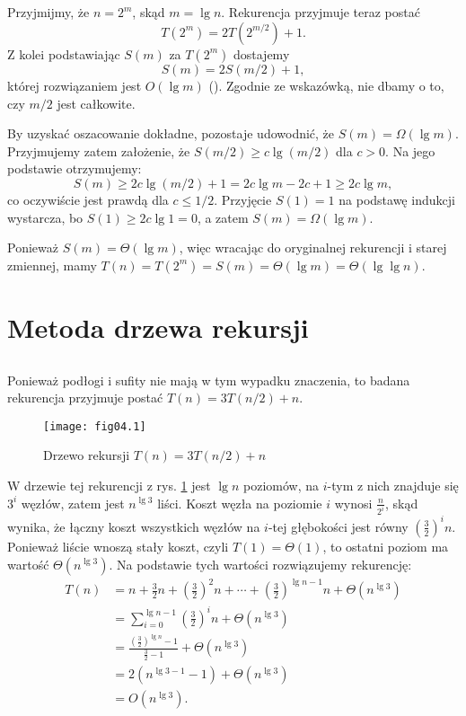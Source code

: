 \subsection{} %
Przyjmijmy, że $n=2^m$, skąd $m=\lg n$. Rekurencja przyjmuje teraz postać
\[
	T(2^m) = 2T(2^{m/2})+1.
\]
Z kolei podstawiając $S(m)$ za $T(2^m)$ dostajemy
\[
	S(m) = 2S(m/2)+1,
\]
której rozwiązaniem jest $O(\lg m)$ (). Zgodnie ze wskazówką, nie dbamy o to, czy $m/2$ jest całkowite.

By uzyskać oszacowanie dokładne, pozostaje udowodnić, że $S(m)=\Omega(\lg m)$. Przyjmujemy zatem założenie, że $S(m/2)\ge c\lg(m/2)$ dla $c>0$. Na jego podstawie otrzymujemy:
\[
	S(m) \ge 2c\lg(m/2)+1 = 2c\lg m-2c+1 \ge 2c\lg m,
\]
co oczywiście jest prawdą dla $c\le1/2$. Przyjęcie $S(1)=1$ na podstawę indukcji wystarcza, bo $S(1)\ge2c\lg1=0$, a zatem $S(m)=\Omega(\lg m)$.

Ponieważ $S(m)=\Theta(\lg m)$, więc wracając do oryginalnej rekurencji i starej zmiennej, mamy $T(n)=T(2^m)=S(m)=\Theta(\lg m)=\Theta(\lg\lg n)$.

\section{Metoda drzewa rekursji}

\subsection{} %
Ponieważ podłogi i sufity nie mają w tym wypadku znaczenia, to badana rekurencja przyjmuje postać $T(n)=3T(n/2)+n$.
\begin{figure}[ht]
	\begin{center}
		\texttt{[image: fig04.1]}
	\end{center}
	\caption{Drzewo rekursji $T(n)=3T(n/2)+n$} \label{fig:4.2-1}
\end{figure}
W drzewie tej rekurencji z rys. \ref{fig:4.2-1} jest $\lg n$ poziomów, na $i$-tym z nich znajduje się $3^i$ węzłów, zatem jest $n^{\lg3}$ liści. Koszt węzła na poziomie $i$ wynosi $\frac{n}{2^i}$, skąd wynika, że łączny koszt wszystkich węzłów na $i$-tej głębokości jest równy $\left(\frac{3}{2}\right)^in$. Ponieważ liście wnoszą stały koszt, czyli $T(1)=\Theta(1)$, to ostatni poziom ma wartość $\Theta(n^{\lg3})$. Na podstawie tych wartości rozwiązujemy rekurencję:
\begin{align*}
	T(n) &= n+\frac{3}{2}n+\left(\frac{3}{2}\right)^2n+\cdots+\left(\frac{3}{2}\right)^{\lg n-1}n+\Theta(n^{\lg 3}) \\
	&= \sum_{i=0}^{\lg n-1}\left(\frac{3}{2}\right)^in+\Theta(n^{\lg 3}) \\
	&= \frac{\left(\frac{3}{2}\right)^{\lg n}-1}{\frac{3}{2}-1}+\Theta(n^{\lg 3}) \\
	&= 2(n^{\lg 3-1}-1)+\Theta(n^{\lg 3}) \\
	&= O(n^{\lg 3}).
\end{align*}

